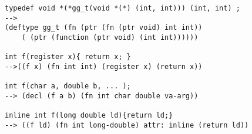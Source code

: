 \begin{verbatim}
typedef void *(*gg_t(void *(*) (int, int))) (int, int) ;
--> 
(deftype gg_t (fn (ptr (fn (ptr void) int int))
	( (ptr (function (ptr void) (int int))))))

int f(register x){ return x; }
-->((f x) (fn int int) (register x) (return x))

int f(char a, double b, ... );
--> (decl (f a b) (fn int char double va-arg))

inline int f(long double ld){return ld;}
--> ((f ld) (fn int long-double) attr: inline (return ld))
\end{verbatim}

